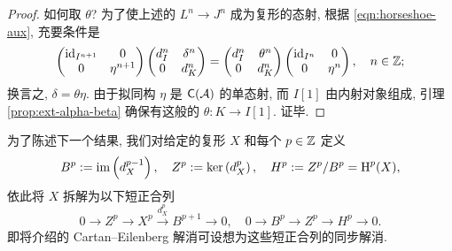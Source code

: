 \begin{proof}
	如何取 $\theta$? 为了使上述的 $L^n \to J^n$ 成为复形的态射, 根据 \eqref{eqn:horseshoe-aux}, 充要条件是
	\[\begin{pmatrix}
		\mathrm{id}_{I^{n+1}} & 0 \\
		0 & \eta^{n+1}
	\end{pmatrix} \begin{pmatrix}
		d_I^n & \delta^n \\
		0 & d_K^n
	\end{pmatrix} = \begin{pmatrix}
		d_I^n & \theta^n \\
		0 & d_K^n \\
	\end{pmatrix} \begin{pmatrix}
		\mathrm{id}_{I^n} & 0 \\
		0 & \eta^n
	\end{pmatrix}, \quad n \in \mathbb{Z} ; \]
	换言之, $\delta = \theta \eta$. 由于拟同构 $\eta$ 是 $\mathsf{C}(\mathcal{A})$ 的单态射, 而 $I[1]$ 由内射对象组成, 引理 \ref{prop:ext-alpha-beta} 确保有这般的 $\theta: K \to I[1]$. 证毕.
\end{proof}

为了陈述下一个结果, 我们对给定的复形 $X$ 和每个 $p \in \mathbb{Z}$ 定义
\[ B^p := \operatorname{im}\left( d_X^{p-1} \right), \quad Z^p := \operatorname{ker}\left( d_X^p \right), \quad H^p := Z^p/B^p = \operatorname{H}^p(X) , \]
依此将 $X$ 拆解为以下短正合列
\[ 0 \to Z^p \to X^p \xrightarrow{d_X^p} B^{p+1} \to 0, \quad 0 \to B^p \to Z^p \to H^p \to 0. \]
即将介绍的 Cartan--Eilenberg 解消可设想为这些短正合列的同步解消.

